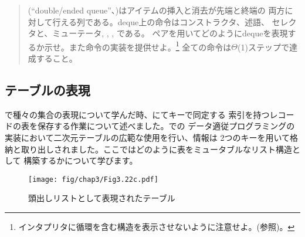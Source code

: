 \begin{quote}
(``double\-/ended queue''、)はアイテムの挿入と消去が先端と終端の
両方に対して行える列である。deque上の命令はコンストラクタ、述語、
セレクタと、ミューテータ,
, , である。
ペアを用いてどのようにdequeを表現するか示せ。また命令の実装を提供せよ。\footnote{
インタプリタに循環を含む構造を表示させないように注意せよ。(参照)。}
全ての命令は\( \Theta \)(1)ステップで達成すること。
\end{quote}

\subsection{テーブルの表現}
\label{Section 3.3.3}



で種々の集合の表現について学んだ時、にてキーで同定する
索引を持つレコードの表を保存する作業について述べました。での
データ適従プログラミングの実装において二次元テーブルの広範な使用を行い、情報は
2つのキーを用いて格納と取り出しされました。ここではどのように表をミュータブルなリスト構造として
構築するかについて学びます。

\begin{figure}[tb]
\label{Figure 3.22}
\centering
\begin{comment}
\heading{Figure 3.22:} A table represented as a headed list.

\begin{example}
 +---+---+    +---+---+    +---+---+    +---+---+
 | * | *-+--->| * | *-+--->| * | *-+--->| * | / |
 +-|-+---+    +-|-+---+    +-|-+---+    +-|-+---+
   |            |            |            |
   V            V            V            V
+---------+   +---+---+   +---+---+   +---+---+
| *table* |   | * | * |   | * | * |   | * | * |
+---------+   +-|-+-|-+   +-|-+-|-+   +-|-+-|-+
                |   |       |   |       |   |
                V   V       V   V       V   V
             +---+ +---+ +---+ +---+ +---+ +---+
             | a | | 1 | | b | | 2 | | c | | 3 |
             +---+ +---+ +---+ +---+ +---+ +---+
\end{example}
\end{comment}
\texttt{[image: fig/chap3/Fig3.22c.pdf]}
\par\bigskip
\noindent
{} 頭出しリストとして表現されたテーブル
\end{figure}

